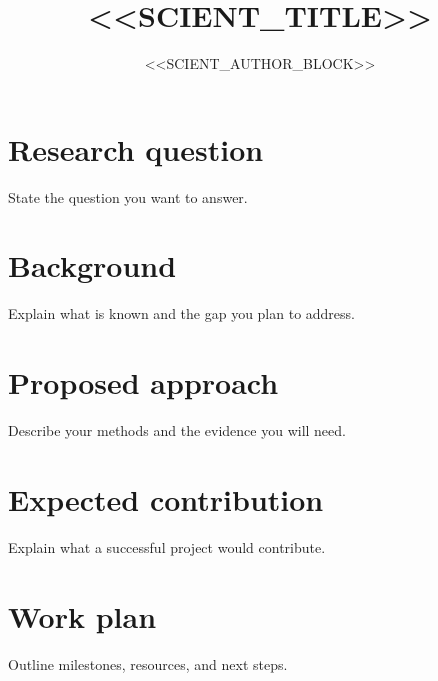 \documentclass[11pt,a4paper]{article}
\title{<<SCIENT_TITLE>>}
\author{<<SCIENT_AUTHOR_BLOCK>>}
\date{}
\begin{document}
\maketitle

\section{Research question}

State the question you want to answer.

\section{Background}

Explain what is known and the gap you plan to address.

\section{Proposed approach}

Describe your methods and the evidence you will need.

\section{Expected contribution}

Explain what a successful project would contribute.

\section{Work plan}

Outline milestones, resources, and next steps.
\end{document}
